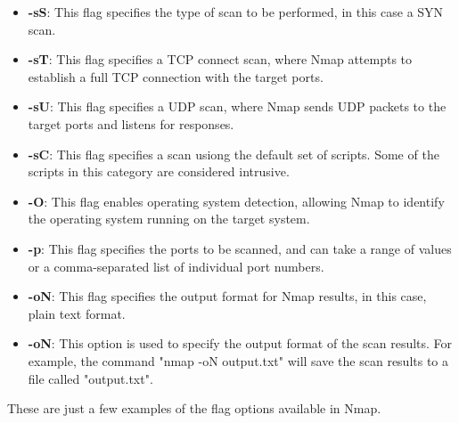 \documentclass[a4paper, 12pt, oneside]{extbook}
\begin{document}
\begin{itemize}
  \item \textbf{-sS}: This flag specifies the type of scan to be performed, in this case a SYN scan.
  \item \textbf{-sT}: This flag specifies a TCP connect scan, where Nmap attempts to establish a full TCP connection with the target ports.
  \item \textbf{-sU}: This flag specifies a UDP scan, where Nmap sends UDP packets to the target ports and listens for responses.
  \item \textbf{-sC}: This flag specifies a scan usiong the default set of scripts. Some of the scripts in this category are considered intrusive.
  \item \textbf{-O}: This flag enables operating system detection, allowing Nmap to identify the operating system running on the target system.
  \item \textbf{-p}: This flag specifies the ports to be scanned, and can take a range of values or a comma-separated list of individual port numbers.
  \item \textbf{-oN}: This flag specifies the output format for Nmap results, in this case, plain text format.
  \item \textbf{-oN}: This option is used to specify the output format of the scan results. For example, the command "nmap -oN output.txt" will save the scan results to a file called "output.txt".
\end{itemize}
These are just a few examples of the flag options available in Nmap.
\end{document}
